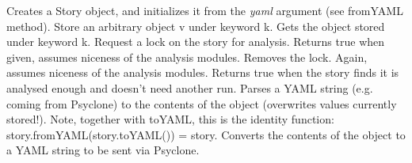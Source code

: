 \begin{interface}
    {Creates a Story object, and initializes it from the \emph{yaml} argument
      (see fromYAML method).}
    {Store an arbitrary object v under keyword k.}
    {Gets the object stored under keyword k.}
    {Request a lock on the story for analysis. Returns true when given, assumes
      niceness of the analysis modules.}
    {Removes the lock. Again, assumes niceness of the analysis modules.}
    {Returns true when the story finds it is analysed enough and doesn't need
      another run.}
    {Parses a \ac{YAML} string (e.g. coming from Psyclone) to the contents of the
      object (overwrites values currently stored!). Note, together with toYAML,
      this is the identity function: story.fromYAML(story.toYAML()) = story.}
    {Converts the contents of the object to a \ac{YAML} string to be sent via
      Psyclone.}
\end{interface}

